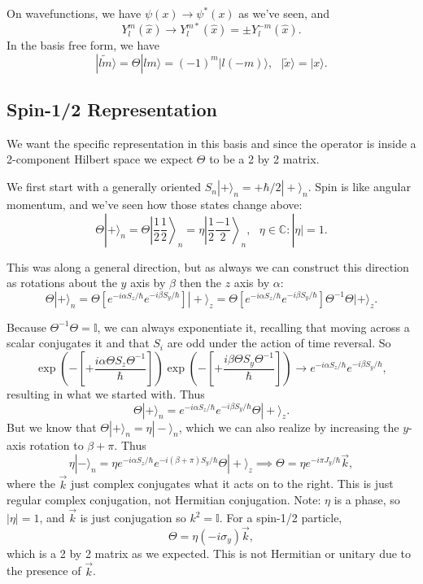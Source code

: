 \documentclass[fontsize=12pt]{scrartcl}
\newcommand{\bb}[1]{\mathbb{#1}}
\newcommand{\Id}{\bb{I}}
\newcommand{\ra}{\rangle}
\begin{document}
On wavefunctions, we have $\psi(x)\to \psi^*(x)$ as we've seen, and $$Y_l^m(\hat{x})\to Y_l^{m*}(\hat{x})=\pm Y_l^{-m}(\hat{x}).$$ In the basis free form, we have $$|\tilde{lm}\ra = \Theta|lm\ra = (-1)^m|l(-m)\ra, \ \ \ |\tilde{x}\ra = |x\ra.$$

\subsection{Spin-1/2 Representation}

We want the specific representation in this basis and since the operator is inside a 2-component Hilbert space we expect $\Theta$ to be a 2 by 2 matrix.

We first start with a generally oriented $S_n|+\ra_n=+\hbar/2|+\ra_n$. Spin is like angular momentum, and we've seen how those states change above: $$\Theta|+\ra_n = \Theta\left|\frac{1}{2}\frac{1}{2}\right\ra_n=\eta\left|\frac{1}{2}\frac{-1}{2}\right\ra_n, \ \ \ \eta\in\bb{C}: |\eta|=1.$$

This was along a general direction, but as always we can construct this direction as rotations about the $y$ axis by $\beta$ then the $z$ axis by $\alpha$: $$\Theta|+\ra_n = \Theta\left[e^{-i\alpha S_z/\hbar}e^{-i\beta S_y/\hbar}\right]|+\ra_z = \Theta\left[e^{-i\alpha S_z/\hbar}e^{-i\beta S_y/\hbar}\right]\Theta^{-1}\Theta|+\ra_z.$$

Because $\Theta^{-1}\Theta=\Id$, we can always exponentiate it, recalling that moving across a scalar conjugates it and that $S_i$ are odd under the action of time reversal. So $$\exp\left(-\left[+\frac{i\alpha \Theta S_z \Theta^{-1}}{\hbar}\right]\right)\exp\left(-\left[+\frac{i\beta \Theta S_y \Theta^{-1}}{\hbar}\right]\right)\to e^{-i\alpha S_z/\hbar}e^{-i\beta S_y/\hbar},$$ resulting in what we started with. Thus $$\Theta|+\ra_n = e^{-i\alpha S_z/\hbar}e^{-i\beta S_y/\hbar}\Theta|+\ra_z.$$ But we know that $\Theta|+\ra_n=\eta|-\ra_n$, which we can also realize by increasing the $y$-axis rotation to $\beta+\pi$. Thus $$\eta|-\ra_n=\eta e^{-i\alpha S_z/\hbar}e^{-i(\beta+\pi) S_y/\hbar}\Theta|+\ra_z\implies \Theta = \eta e^{-i\pi J_y/\hbar}\vec{k},$$ where the $\vec{k}$ just complex conjugates what it acts on to the right. This is just regular complex conjugation, not Hermitian conjugation. Note: $\eta$ is a phase, so $|\eta|=1$, and $\vec{k}$ is just conjugation so $k^2=\Id$. For a spin-1/2 particle, $$\Theta = \eta (-i\sigma_y)\vec{k},$$ which is a 2 by 2 matrix as we expected. This is not Hermitian or unitary due to the presence of $\vec{k}$.
\end{document}
